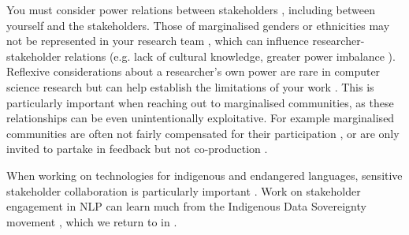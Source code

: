 You must consider power relations between stakeholders \citep{havens_situated_2020}, including between yourself and the stakeholders. Those of marginalised genders or ethnicities may not be represented in your research team \citep{west_discriminating_2019}, which can influence researcher-stakeholder relations (e.g. lack of cultural knowledge, greater power imbalance \citep{madaio2022assessing,fukuda-parr_emerging_2021,haque2024we}). Reflexive considerations about a researcher's own power are rare in computer science research \citep{ovalle_factoring_2023, devinney_theories_2022} but can help establish the limitations of your work \citep{liang_embracing_2021,liang_reflexivity_2021}. This is particularly important when reaching out to marginalised communities, as these relationships can be even unintentionally exploitative. For example marginalised communities are often not fairly compensated for their participation \cite{sloane_participation_2022}, or are only invited to partake in feedback but not co-production \cite{sloane_participation_2022, ungless_stereotypes_2023}.

When working on technologies for indigenous and endangered languages, sensitive stakeholder collaboration is particularly important \citep{bird_decolonising_2020, liu_not_2022, mahelona_openais_2023}. %
Work on stakeholder engagement in NLP can learn much from the Indigenous Data Sovereignty movement \citep{sloane_participation_2022}, which we return to in . 


